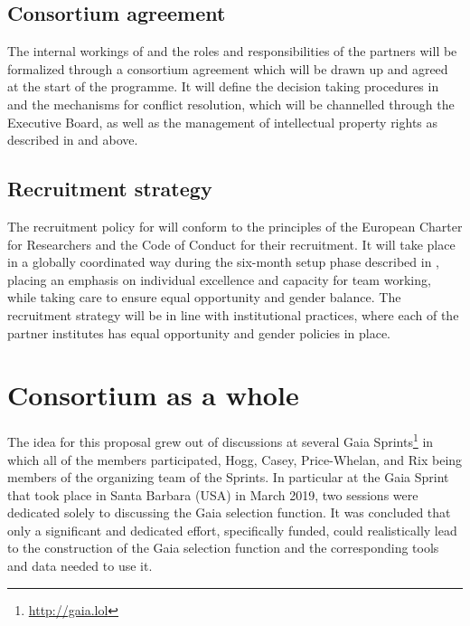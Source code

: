 \subsection{Consortium agreement}
\label{sec:cons_agreement}

The internal workings of {\acro} and the roles and responsibilities of the partners will be formalized through a consortium agreement which will be drawn up and agreed at the start of the programme. It will define the decision taking procedures in {\acro} and the mechanisms for conflict resolution, which will be channelled through the Executive Board, as well as the management of intellectual property rights as described in  and  above.

\subsection{Recruitment strategy}
\label{sec:recruit}

The recruitment policy for {\acro} will conform to the principles of the European Charter for Researchers and the Code of Conduct for their recruitment. It will take place in a globally coordinated way during the six-month setup phase described in , placing an emphasis on individual excellence and capacity for team working, while taking care to ensure equal opportunity and gender balance. The recruitment strategy will be in line with institutional practices, where each of the partner institutes has equal opportunity and gender policies in place.


\section{Consortium as a whole}
\label{sec:consortium}

The idea for this proposal grew out of discussions at several Gaia Sprints\footnote{\url{http://gaia.lol}} in which all of the {\acro} members participated, Hogg, Casey, Price-Whelan, and Rix being members of the organizing team of the Sprints. In particular at the Gaia Sprint that took place in Santa Barbara (USA) in March 2019, two sessions were dedicated solely to discussing the Gaia selection function. It was concluded that only a significant and dedicated effort, specifically funded, could realistically lead to the construction of the Gaia selection function and the corresponding tools and data needed to use it.

